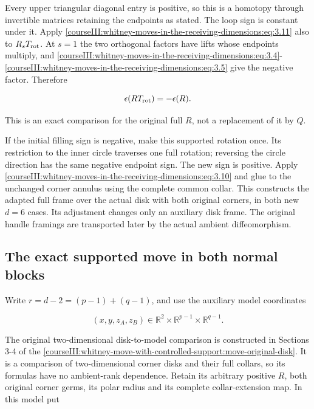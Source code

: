 Every upper triangular diagonal entry is positive, so this is a homotopy through invertible matrices retaining the endpoints as stated. The loop sign is constant under it. Apply \eqref{courseIII:whitney-moves-in-the-receiving-dimensions:eq:3.11} also to \(R_s T_{\rm rot}\). At \(s=1\) the two orthogonal factors have lifts whose endpoints multiply, and \eqref{courseIII:whitney-moves-in-the-receiving-dimensions:eq:3.4}-\eqref{courseIII:whitney-moves-in-the-receiving-dimensions:eq:3.5} give the negative factor. Therefore

\begin{equation}
\epsilon(RT_{\rm rot})=-\epsilon(R).
 \label{courseIII:whitney-moves-in-the-receiving-dimensions:eq:3.12}
\end{equation}

This is an exact comparison for the original full \(R\), not a replacement of it by \(Q\).

If the initial filling sign is negative, make this supported rotation once. Its restriction to the inner circle traverses one full rotation; reversing the circle direction has the same negative endpoint sign. The new sign is positive. Apply \eqref{courseIII:whitney-moves-in-the-receiving-dimensions:eq:3.10} and glue to the unchanged corner annulus using the complete common collar. This constructs the adapted full frame over the actual disk with both original corners, in both new \(d=6\) cases. Its adjustment changes only an auxiliary disk frame. The original handle framings are transported later by the actual ambient diffeomorphism.

\subsection{The exact supported move in both normal blocks}
\label{courseIII:whitney-moves-in-the-receiving-dimensions:receiving-whitney-flow}

\label{courseIII:whitney-moves-in-the-receiving-dimensions:section-4}\label{courseIII:whitney-receiving:4}

Write \(r=d-2=(p-1)+(q-1)\), and use the auxiliary model coordinates

\begin{equation}
(x,y,z_A,z_B)\in
 \mathbb R^2\times\mathbb R^{p-1}\times\mathbb R^{q-1}.
 \label{courseIII:whitney-moves-in-the-receiving-dimensions:eq:4.1}
\end{equation}

The original two-dimensional disk-to-model comparison is constructed in Sections 3-4 of the \cref{courseIII:whitney-move-with-controlled-support:move-original-disk}. It is a comparison of two-dimensional corner disks and their full collars, so its formulas have no ambient-rank dependence. Retain its arbitrary positive \(R\), both original corner germs, its polar radius and its complete collar-extension map. In this model put

